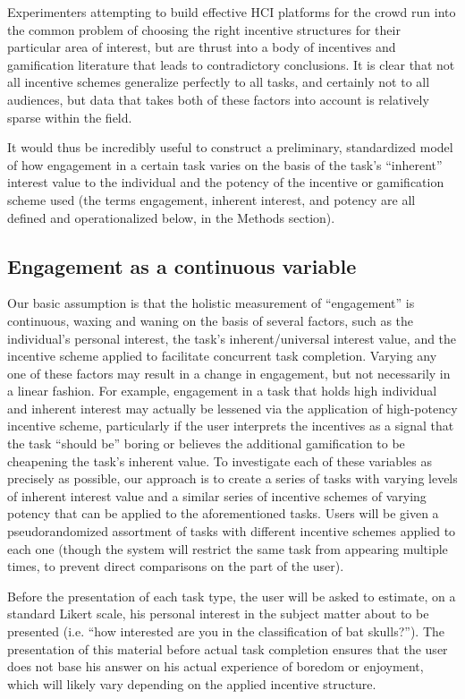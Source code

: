 \documentclass{sigchi}
\begin{document}
Experimenters attempting to build effective HCI platforms for the crowd run into the common problem of choosing the right incentive structures for their particular area of interest, but are thrust into a body of incentives and gamification literature that leads to contradictory conclusions. It is clear that not all incentive schemes generalize perfectly to all tasks, and certainly not to all audiences, but data that takes both of these factors into account is relatively sparse within the field.

It would thus be incredibly useful to construct a preliminary, standardized model of how engagement in a certain task varies on the basis of the task's “inherent” interest value to the individual and the potency of the incentive or gamification scheme used (the terms engagement, inherent interest, and potency are all defined and operationalized below, in the Methods section). 

\subsection{Engagement as a continuous variable}

Our basic assumption is that the holistic measurement of “engagement” is continuous, waxing and waning on the basis of several factors, such as the individual’s personal interest, the task’s inherent/universal interest value, and the incentive scheme applied to facilitate concurrent task completion. Varying any one of these factors may result in a change in engagement, but not necessarily in a linear fashion. For example, engagement in a task that holds high individual and inherent interest may actually be lessened via the application of high-potency incentive scheme, particularly if the user interprets the incentives as a signal that the task “should be” boring or believes the additional gamification to be cheapening the task’s inherent value. 
To investigate each of these variables as precisely as possible, our approach is to create a series of tasks with varying levels of inherent interest value and a similar series of incentive schemes of varying potency that can be applied to the aforementioned tasks. Users will be given a pseudorandomized assortment of tasks with different incentive schemes applied to each one (though the system will restrict the same task from appearing multiple times, to prevent direct comparisons on the part of the user). 

Before the presentation of each task type, the user will be asked to estimate, on a standard Likert scale, his personal interest in the subject matter about to be presented (i.e. “how interested are you in the classification of bat skulls?”). The presentation of this material before actual task completion ensures that the user does not base his answer on his actual experience of boredom or enjoyment, which will likely vary depending on the applied incentive structure. \cite{Easley:2013:IGG:2492002.2482571} 
\end{document}
